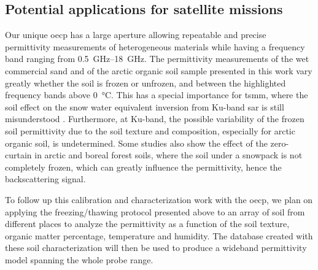 \subsection{Potential applications for satellite missions}
Our unique \acl{oecp} has a large aperture allowing repeatable and precise permittivity measurements of heterogeneous materials while having a frequency band ranging from \qtyrange{0.5}{18}{\giga\hertz}.
The permittivity measurements of the wet commercial sand and of the arctic organic soil sample presented in this work vary greatly whether the soil is frozen or unfrozen, and between the highlighted frequency bands above \qty{0}{\degreeCelsius}.
This has a special importance for \ac{tsmm}, where the soil effect on the snow water equivalent inversion from Ku-band \ac{sar} is still misunderstood \parencite{King2018,Rutter2019}.
Furthermore, at Ku-band, the possible variability of the frozen soil permittivity due to the soil texture and composition, especially for arctic organic soil, is undetermined.
Some studies also show the effect of the zero-curtain \parencite{Outcalt1990,Domine2018} in arctic and boreal forest soils, where the soil under a snowpack is not completely frozen, which can greatly influence the permittivity, hence the backscattering signal.

To follow up this calibration and characterization work with the \ac{oecp}, we plan on applying the freezing/thawing protocol presented above to an array of soil from different places to analyze the permittivity as a function of the soil texture, organic matter percentage, temperature and humidity.
The database created with these soil characterization will then be used to produce a wideband permittivity model spanning the whole probe range.
